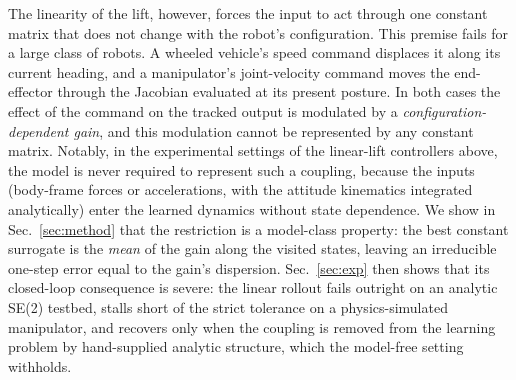 \documentclass[lettersize,journal]{IEEEtran}
\theoremstyle{remark}
\begin{document}
The linearity of the lift, however, forces the input to act through
one constant matrix that does not change with the robot's
configuration. This premise fails for a large class of robots. A
wheeled vehicle's speed command displaces it along its current heading,
and a manipulator's joint-velocity command moves the end-effector
through the Jacobian evaluated at its present posture. In both cases
the effect of the command on the tracked output is modulated by a
\emph{configuration-dependent gain}, and this modulation cannot be
represented by any constant matrix. Notably, in the experimental
settings of the linear-lift controllers above, the model is never
required to represent such a coupling, because the inputs (body-frame
forces or accelerations, with the attitude kinematics integrated
analytically) enter the learned dynamics without state dependence.
We show in Sec.~\ref{sec:method} that the restriction is a model-class
property: the best constant surrogate is the \emph{mean} of the gain
along the visited states, leaving an irreducible one-step error equal
to the gain's dispersion. Sec.~\ref{sec:exp} then shows that its
closed-loop consequence is severe: the linear rollout fails outright on
an analytic SE(2) testbed, stalls short of the strict tolerance on a
physics-simulated manipulator, and recovers only when the coupling is
removed from the learning problem by hand-supplied analytic structure,
which the model-free setting withholds.
\end{document}
